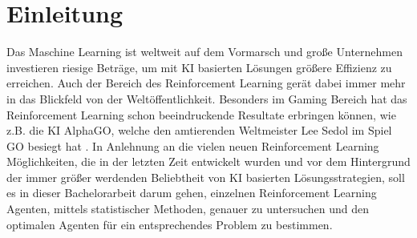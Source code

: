 \chapter{Einleitung}\label{chap:Einleitung}
Das Maschine Learning ist weltweit auf dem Vormarsch und große Unternehmen investieren riesige Beträge, um mit KI basierten Lösungen größere Effizienz zu erreichen. Auch der Bereich des Reinforcement Learning gerät dabei immer mehr in das Blickfeld von der Weltöffentlichkeit. Besonders im Gaming Bereich hat das Reinforcement Learning schon beeindruckende Resultate erbringen können, wie z.B. die KI AlphaGO, welche den amtierenden Weltmeister Lee Sedol im Spiel GO besiegt hat \cite{UAV}. In Anlehnung an die vielen neuen Reinforcement Learning Möglichkeiten, die in der letzten Zeit entwickelt wurden und vor dem Hintergrund der immer größer werdenden Beliebtheit von KI basierten Lösungsstrategien, soll es in dieser Bachelorarbeit darum gehen, einzelnen Reinforcement Learning Agenten, mittels statistischer Methoden, genauer zu untersuchen und den optimalen Agenten für ein entsprechendes Problem zu bestimmen.

